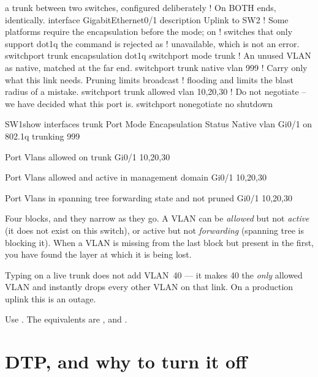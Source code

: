\begin{config}{a trunk between two switches, configured deliberately}
! On BOTH ends, identically.
interface GigabitEthernet0/1
 description Uplink to SW2
 ! Some platforms require the encapsulation before the mode; on
 ! switches that only support dot1q the command is rejected as
 ! unavailable, which is not an error.
 switchport trunk encapsulation dot1q
 switchport mode trunk
 ! An unused VLAN as native, matched at the far end.
 switchport trunk native vlan 999
 ! Carry only what this link needs. Pruning limits broadcast
 ! flooding and limits the blast radius of a mistake.
 switchport trunk allowed vlan 10,20,30
 ! Do not negotiate -- we have decided what this port is.
 switchport nonegotiate
 no shutdown
\end{config}

\begin{verify}{SW1}{show interfaces trunk}
Port        Mode         Encapsulation  Status        Native vlan
Gi0/1       on           802.1q         trunking      999

Port        Vlans allowed on trunk
Gi0/1       10,20,30

Port        Vlans allowed and active in management domain
Gi0/1       10,20,30

Port        Vlans in spanning tree forwarding state and not pruned
Gi0/1       10,20,30
\end{verify}

Four blocks, and they narrow as they go. A VLAN can be \emph{allowed} but not
\emph{active} (it does not exist on this switch), or active but not
\emph{forwarding} (spanning tree is blocking it). When a VLAN is missing from the
last block but present in the first, you have found the layer at which it is
being lost.

\begin{alertbox}
Typing  on a live trunk does not add
VLAN~40 --- it makes 40 the \emph{only} allowed VLAN and instantly drops every
other VLAN on that link. On a production uplink this is an outage.

Use . The equivalents are
,  and .
\end{alertbox}

\section{DTP, and why to turn it off}

